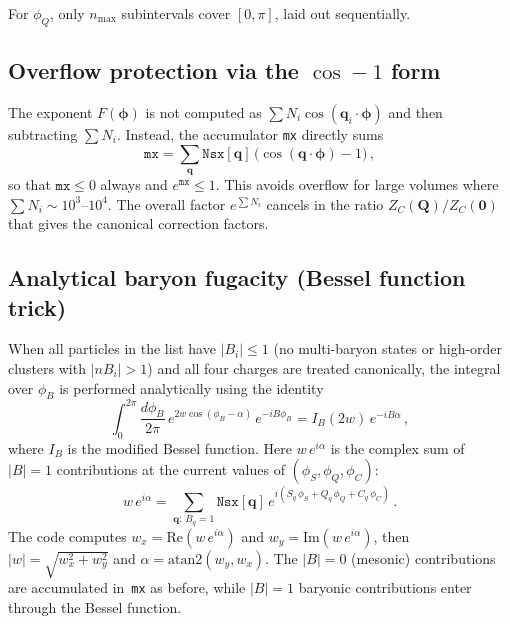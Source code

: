 \documentclass[11pt,a4paper]{article}
\newcommand{\bphi}{\bm{\phi}}
\newcommand{\bq}{\bm{q}}
\newcommand{\bQ}{\bm{Q}}
\begin{document}
For $\phi_Q$, only $n_{\max}$ subintervals cover $[0, \pi]$, laid out sequentially.

\subsection{Overflow protection via the \texorpdfstring{$\cos - 1$}{cos-1} form}
\label{sec:overflow}

The exponent $F(\bphi)$ is not computed as $\sum N_i \cos(\bq_i \cdot \bphi)$ and then subtracting $\sum N_i$.
Instead, the accumulator \texttt{mx} directly sums
\begin{equation}
  \texttt{mx} = \sum_{\bq} \texttt{Nsx}[\bq]\,\bigl(\cos(\bq \cdot \bphi) - 1\bigr)\,,
\end{equation}
so that $\texttt{mx} \leq 0$ always and $e^{\texttt{mx}} \leq 1$.
This avoids overflow for large volumes where $\sum N_i \sim 10^3$--$10^4$.
The overall factor $e^{\sum N_i}$ cancels in the ratio $Z_C(\bQ)/Z_C(\bm{0})$ that gives the canonical correction factors.

\subsection{Analytical baryon fugacity (Bessel function trick)}
\label{sec:banalyt}

When all particles in the list have $|B_i| \leq 1$ (no multi-baryon states or high-order clusters with $|nB_i| > 1$) and all four charges are treated canonically, the integral over $\phi_B$ is performed analytically using the identity
\begin{equation}\label{eq:bessel-identity}
  \int_0^{2\pi} \frac{d\phi_B}{2\pi}\,e^{2w\cos(\phi_B - \alpha)}\,e^{-iB\phi_B}
  = I_B(2w)\,e^{-iB\alpha}\,,
\end{equation}
where $I_B$ is the modified Bessel function.
Here $w\,e^{i\alpha}$ is the complex sum of $|B|=1$ contributions at the current values of $(\phi_S, \phi_Q, \phi_C)$:
\begin{equation}
  w\,e^{i\alpha} = \sum_{\bq:\,B_q = 1} \texttt{Nsx}[\bq]\,e^{i(S_q\,\phi_S + Q_q\,\phi_Q + C_q\,\phi_C)}\,.
\end{equation}
The code computes $w_x = \text{Re}(w\,e^{i\alpha})$ and $w_y = \text{Im}(w\,e^{i\alpha})$, then $|w| = \sqrt{w_x^2 + w_y^2}$ and $\alpha = \text{atan2}(w_y, w_x)$.
The $|B|=0$ (mesonic) contributions are accumulated in~\texttt{mx} as before, while $|B|=1$ baryonic contributions enter through the Bessel function.
\end{document}
